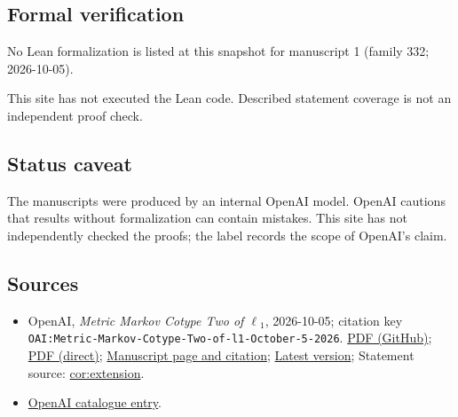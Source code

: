 \documentclass[11pt]{article}
\begin{document}
\subsection{Formal verification}
No Lean formalization is listed at this snapshot for manuscript 1 (family 332; 2026-10-05).

This site has not executed the Lean code. Described statement coverage is not an independent proof check.

\subsection{Status caveat}
The manuscripts were produced by an internal OpenAI model. OpenAI cautions that results without formalization can contain mistakes. This site has not independently checked the proofs; the label records the scope of OpenAI's claim.

\subsection{Sources}
\begin{itemize}
\item OpenAI, \emph{Metric Markov Cotype Two of \(\ell\)\({}_{1}\)}, 2026-10-05; citation key \texttt{OAI:Metric-Markov-Cotype-Two-of-l1-October-5-2026}. \href{https://github.com/openai/math/blob/adc7f1241b42e322a6451854ab7e4b4c146bf78a/preprints/Metric-Markov-Cotype-Two-of-l1-October-5-2026/l1-markov-cotype.pdf}{PDF (GitHub)}; \href{https://github.com/openai/math/raw/adc7f1241b42e322a6451854ab7e4b4c146bf78a/preprints/Metric-Markov-Cotype-Two-of-l1-October-5-2026/l1-markov-cotype.pdf}{PDF (direct)}; \href{https://github.com/openai/math/blob/adc7f1241b42e322a6451854ab7e4b4c146bf78a/preprints/Metric-Markov-Cotype-Two-of-l1-October-5-2026/README.md}{Manuscript page and citation}; \href{https://github.com/openai/math/blob/main/preprints/Metric-Markov-Cotype-Two-of-l1-October-5-2026/l1-markov-cotype.pdf}{Latest version}; Statement source: \href{https://github.com/openai/math/blob/adc7f1241b42e322a6451854ab7e4b4c146bf78a/preprints/Metric-Markov-Cotype-Two-of-l1-October-5-2026/build/main.tex\#L627}{cor:extension}.
\item \href{https://github.com/openai/math/blob/adc7f1241b42e322a6451854ab7e4b4c146bf78a/CONTENTS.md}{OpenAI catalogue entry}.
\end{itemize}
\end{document}
